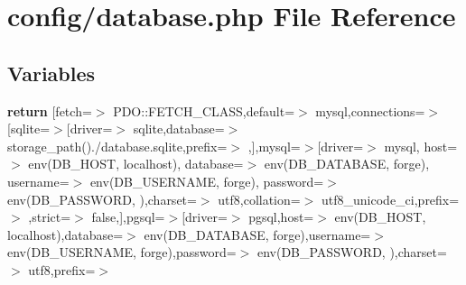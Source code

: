 \section{config/database.php File Reference}
\label{config_2database_8php}
\subsection*{Variables}
\begin{DoxyCompactItemize}
\item 
{\bf return} [\textquotesingle{}fetch\textquotesingle{}=$>$ P\+D\+O\+::\+F\+E\+T\+C\+H\+\_\+\+C\+L\+A\+S\+S,\textquotesingle{}default\textquotesingle{}=$>$ \textquotesingle{}mysql\textquotesingle{},\textquotesingle{}connections\textquotesingle{}=$>$[\textquotesingle{}sqlite\textquotesingle{}=$>$[\textquotesingle{}driver\textquotesingle{}=$>$ \textquotesingle{}sqlite\textquotesingle{},\textquotesingle{}database\textquotesingle{}=$>$ storage\+\_\+path().\textquotesingle{}/database.\+sqlite\textquotesingle{},\textquotesingle{}prefix\textquotesingle{}=$>$ \textquotesingle{}\textquotesingle{},],\textquotesingle{}mysql\textquotesingle{}=$>$[\textquotesingle{}driver\textquotesingle{}=$>$ \textquotesingle{}mysql\textquotesingle{}, \textquotesingle{}host\textquotesingle{}=$>$ env(\textquotesingle{}D\+B\+\_\+\+H\+O\+S\+T\textquotesingle{}, \textquotesingle{}localhost\textquotesingle{}), \textquotesingle{}database\textquotesingle{}=$>$ env(\textquotesingle{}D\+B\+\_\+\+D\+A\+T\+A\+B\+A\+S\+E\textquotesingle{}, \textquotesingle{}forge\textquotesingle{}), \textquotesingle{}username\textquotesingle{}=$>$ env(\textquotesingle{}D\+B\+\_\+\+U\+S\+E\+R\+N\+A\+M\+E\textquotesingle{}, \textquotesingle{}forge\textquotesingle{}), \textquotesingle{}password\textquotesingle{}=$>$ env(\textquotesingle{}D\+B\+\_\+\+P\+A\+S\+S\+W\+O\+R\+D\textquotesingle{}, \textquotesingle{}\textquotesingle{}),\textquotesingle{}charset\textquotesingle{}=$>$ \textquotesingle{}utf8\textquotesingle{},\textquotesingle{}collation\textquotesingle{}=$>$ \textquotesingle{}utf8\+\_\+unicode\+\_\+ci\textquotesingle{},\textquotesingle{}prefix\textquotesingle{}=$>$ \textquotesingle{}\textquotesingle{},\textquotesingle{}strict\textquotesingle{}=$>$ false,],\textquotesingle{}pgsql\textquotesingle{}=$>$[\textquotesingle{}driver\textquotesingle{}=$>$ \textquotesingle{}pgsql\textquotesingle{},\textquotesingle{}host\textquotesingle{}=$>$ env(\textquotesingle{}D\+B\+\_\+\+H\+O\+S\+T\textquotesingle{}, \textquotesingle{}localhost\textquotesingle{}),\textquotesingle{}database\textquotesingle{}=$>$ env(\textquotesingle{}D\+B\+\_\+\+D\+A\+T\+A\+B\+A\+S\+E\textquotesingle{}, \textquotesingle{}forge\textquotesingle{}),\textquotesingle{}username\textquotesingle{}=$>$ env(\textquotesingle{}D\+B\+\_\+\+U\+S\+E\+R\+N\+A\+M\+E\textquotesingle{}, \textquotesingle{}forge\textquotesingle{}),\textquotesingle{}password\textquotesingle{}=$>$ env(\textquotesingle{}D\+B\+\_\+\+P\+A\+S\+S\+W\+O\+R\+D\textquotesingle{}, \textquotesingle{}\textquotesingle{}),\textquotesingle{}charset\textquotesingle{}=$>$ \textquotesingle{}utf8\textquotesingle{},\textquotesingle{}prefix\textquotesingle{}=$>$ 
\end{DoxyCompactItemize}
